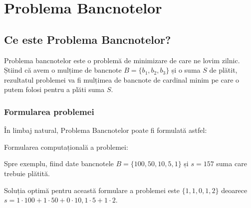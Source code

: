 \chapter{Problema Bancnotelor}

\section{Ce este Problema Bancnotelor?}

Problema bancnotelor este o problemă de minimizare de care ne lovim zilnic. Știind că avem o  mulțime de bancnote $ B = \{ b_1, b_2, b_3\}$ și o suma $S$ de plătit, rezultatul problemei va fi mulțimea de bancnote de cardinal minim pe care o putem folosi pentru a plăti suma $S$.

\subsection{Formularea problemei}

În limbaj natural, Problema Bancnotelor poate fi formulată astfel:
\par
\vspace{0.5cm}
\par
\vspace{0.7cm}
Formularea computațională a problemei:\par
\vspace{0.5cm}
\par 
Spre exemplu, fiind date bancnotele $B = \{100,50,10,5,1\}$ și  $s = 157$ suma care trebuie plătită. \par
Soluția optimă pentru această formulare a problemei este 
$\{1,1,0,1,2\}$ deoarece $ s = 1\cdot 100+1	\cdot 50+0	\cdot10,1	\cdot5+1	\cdot2 $.


